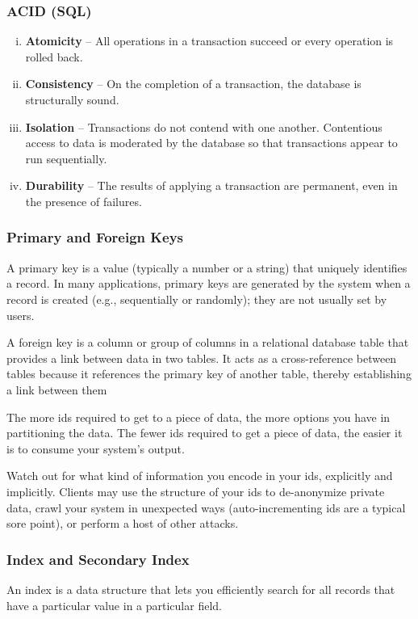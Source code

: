 \documentclass{article}
\begin{document}
    \subsubsection{ACID (SQL)}
    \begin{enumerate}[i.]
        \item \textbf{Atomicity} -- All operations in a transaction succeed or every operation is rolled back.
        \item \textbf{Consistency} -- On the completion of a transaction, the database is structurally sound.
        \item \textbf{Isolation} -- Transactions do not contend with one another. Contentious access to data is moderated by the database so that transactions appear to run sequentially.
        \item \textbf{Durability} -- The results of applying a transaction are permanent, even in the presence of failures.
    \end{enumerate}
    
    \subsubsection{Primary and Foreign Keys}
    A primary key is a value (typically a number or a string) that uniquely identifies a record. In many applications, primary keys are generated by the system when a record is created (e.g., sequentially or randomly); they are not usually set by users.
    
    A foreign key is a column or group of columns in a relational database table that provides a link between data in two tables. It acts as a cross-reference between tables because it references the primary key of another table, thereby establishing a link between them
    
    The more ids required to get to a piece of data, the more options you have in partitioning the data. The fewer ids required to get a piece of data, the easier it is to consume your system’s output.
    
    Watch out for what kind of information you encode in your ids, explicitly and implicitly. Clients may use the structure of your ids to de-anonymize private data, crawl your system in unexpected ways (auto-incrementing ids are a typical sore point), or perform a host of other attacks.
    
    \subsubsection{Index and Secondary Index}
    An index is a data structure that lets you efficiently   search for all records that have a particular value in a particular field.
    
\end{document}
